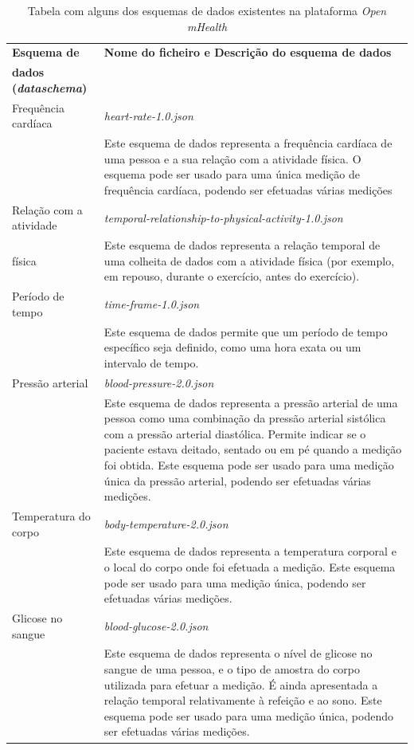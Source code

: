 \begin{table}[H]
\centering
\label{t:schemaslist}
\begin{tabularx}{1\textwidth}{p{4cm} p{10.7cm}}
 \textbf{Esquema de }  &   \textbf{Nome do ficheiro e Descrição do esquema de dados}  \\
 \textbf{dados (\textit{dataschema})} & \\
\hline
Frequência cardíaca & \textit{heart-rate-1.0.json} \\ 
& Este esquema de dados representa a frequência cardíaca de uma pessoa e a sua relação com a atividade física. O esquema pode ser usado para uma única medição de frequência cardíaca, podendo ser efetuadas várias medições\\ \hline

Relação com a atividade & \textit{temporal-relationship-to-physical-activity-1.0.json} \\
física& Este esquema de dados representa a relação temporal de uma colheita de dados com a atividade física (por exemplo, em repouso, durante o exercício, antes do exercício). \\ \hline

Período de tempo & \textit{time-frame-1.0.json} \\
& Este esquema de dados permite que um período de tempo específico seja definido, como uma hora exata ou um intervalo de tempo. \\ \hline

Pressão arterial & \textit{blood-pressure-2.0.json} \\ 
& Este esquema de dados representa a pressão arterial de uma pessoa como uma combinação da pressão arterial sistólica com a pressão arterial diastólica. Permite indicar se o paciente estava deitado, sentado ou em pé quando a medição foi obtida. Este esquema pode ser usado para uma medição única da pressão arterial, podendo ser efetuadas várias medições. \\ \hline

Temperatura do corpo & \textit{body-temperature-2.0.json} \\
& Este esquema de dados representa a temperatura corporal e o local do corpo onde foi efetuada a medição. Este esquema pode ser usado para uma medição única, podendo ser efetuadas várias medições. \\ \hline

Glicose no sangue & \textit{blood-glucose-2.0.json} \\ 
& Este esquema de dados representa o nível de glicose no sangue de uma pessoa, e o tipo de amostra do corpo utilizada para efetuar a medição. É ainda apresentada a relação temporal relativamente à refeição e ao sono. Este esquema pode ser usado para uma medição única, podendo ser efetuadas várias medições.
                 
\end{tabularx}
\caption{Tabela com alguns dos esquemas de dados existentes na plataforma \textit{Open mHealth}}
\end{table}



